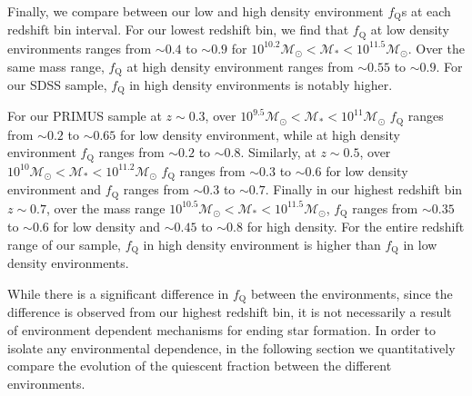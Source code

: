 \documentclass{emulateapj}
\begin{document}

Finally, we compare between our low and high density environment
$f_{\mathrm{Q}}$s at each redshift bin interval. For our lowest redshift
bin, we find that $f_{\mathrm{Q}}$ at low density environments ranges from
$\sim 0.4$ to $\sim 0.9$ for $10^{10.2} \mathcal{M}_{\odot} <
\mathcal{M}_{*} < 10^{11.5} \mathcal{M}_{\odot}$. Over the same mass
range, $f_{\mathrm{Q}}$ at high density environment ranges from $\sim
0.55$ to $\sim 0.9$. For our SDSS sample, $f_{\mathrm{Q}}$ in
high density environments is notably higher. 

For our PRIMUS sample at $z \sim 0.3$, over $10^{9.5} \mathcal{M}_{\odot} < \mathcal{M}_{*} < 10^{11} \mathcal{M}_{\odot}$ $f_{\mathrm{Q}}$ ranges from $\sim 0.2$ to $\sim 0.65$ for low density environment, while at high density environment $f_{\mathrm{Q}}$ ranges from $\sim 0.2$ to $\sim 0.8$. Similarly, at $z \sim 0.5$, over $10^{10} \mathcal{M}_{\odot} < \mathcal{M}_{*} < 10^{11.2} \mathcal{M}_{\odot}$ $f_{\mathrm{Q}}$ ranges from $\sim 0.3$ to $\sim 0.6$ for low density environment and $f_{\mathrm{Q}}$ ranges from $\sim 0.3$ to $\sim 0.7$. Finally in our highest redshift bin $z \sim 0.7$, over the mass range $10^{10.5} \mathcal{M}_{\odot} < \mathcal{M}_{*} < 10^{11.5} \mathcal{M}_{\odot}$, $f_{\mathrm{Q}}$ ranges from $\sim 0.35$ to $\sim 0.6$ for low density and $\sim 0.45$ to $\sim 0.8$ for high density. For the entire redshift range of our sample, $f_{\mathrm{Q}}$ in high density environment is higher than $f_{\mathrm{Q}}$ in low density environments. 

While there is a significant difference in $f_{\mathrm{Q}}$ between the
environments, since the difference is observed from our highest
redshift bin, it is not necessarily a result of environment dependent
mechanisms for ending star formation. In order to isolate any
environmental dependence, in the following section we quantitatively
compare the evolution of the quiescent fraction between the different
environments.
\end{document}
